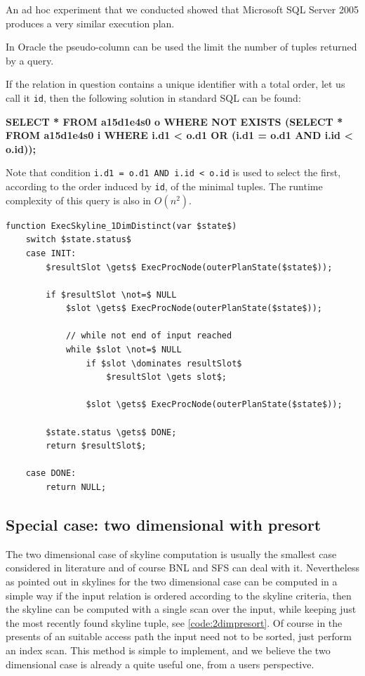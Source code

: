 \noindent
An ad hoc experiment that we conducted showed that Microsoft SQL Server
2005 produces a very similar execution plan.

In Oracle the pseudo-column 
can be used the limit the number of tuples returned by a query.

If the relation in question contains a unique identifier with a total
order, let us call it \texttt{id}, then the following solution in
standard SQL can be found:

\begin{interactive}
\textbf{SELECT * FROM a15d1e4s0 o WHERE NOT EXISTS
    (SELECT * FROM a15d1e4s0 i WHERE i.d1 < o.d1 OR (i.d1 = o.d1 AND i.id < o.id));}
\end{interactive}

\noindent
Note that condition \texttt{i.d1 = o.d1 AND i.id < o.id} is used to
select the first, according to the order induced by \texttt{id}, of the
minimal tuples. The runtime complexity of this query is also in $O(n^2)$.

\begin{lstlisting}[language=pseudo,
caption={Pseudo-code for Special case: 1 dimensional distinct},
label={code:1dimdistinct}
]
function ExecSkyline_1DimDistinct(var $state$)
	switch $state.status$
	case INIT:
		$resultSlot \gets$ ExecProcNode(outerPlanState($state$));

		if $resultSlot \not=$ NULL
			$slot \gets$ ExecProcNode(outerPlanState($state$));

			// while not end of input reached
			while $slot \not=$ NULL
				if $slot \dominates resultSlot$
					$resultSlot \gets slot$;

				$slot \gets$ ExecProcNode(outerPlanState($state$));

		$state.status \gets$ DONE;
		return $resultSlot$;

	case DONE:
		return NULL;
\end{lstlisting}


\subsection{Special case: two dimensional with presort}
\label{sec:presort}
The two dimensional case of skyline computation is usually the
smallest case considered in literature and of course BNL and SFS can
deal with it.  Nevertheless as pointed out in \citep{Borzsonyi2001}
skylines for the two dimensional case can be computed in a simple way
if the input relation is ordered according to the skyline criteria,
then the skyline can be computed with a single scan over the
input, while keeping just the most recently found skyline tuple, see
\autoref{code:2dimpresort}.  Of course in the presents of an
suitable access path the input need not to be sorted, just perform an
index scan.  This method is simple to implement, and we believe the
two dimensional case is already a quite useful one, from a users
perspective.

